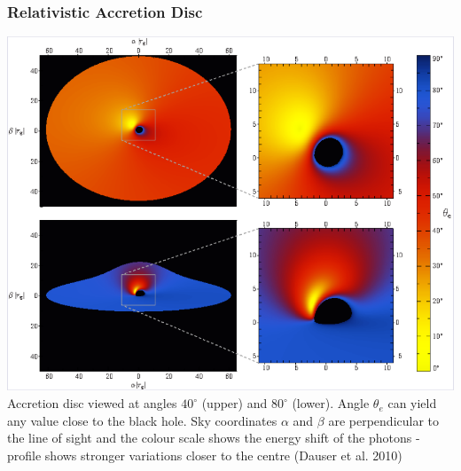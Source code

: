 \documentclass[]{beamer}
\begin{document}
\begin{frame}
\frametitle{Relativistic Accretion Disc} \centering 
{
\includegraphics[scale=0.35]{relxill_rays.png}\\
\caption{Accretion disc viewed at angles $40^\circ$ (upper) and $80^\circ$ (lower). Angle $\theta_e$ can yield any value close to the black hole. Sky coordinates $\alpha$ and $\beta$ are perpendicular to the line of sight and the colour scale shows the energy shift of the photons - profile shows stronger variations closer to the centre (Dauser et al. 2010)}
}
\end{frame}
\end{document}
